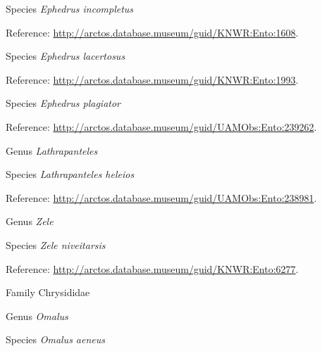 \documentclass[9pt, article]{memoir}
\begin{document}
\begin{multicols}{2}
\vspace{6pt}\noindent\hspace{36pt}Species \textit{Ephedrus incompletus}


\vspace{6pt}Reference: 
\url{http://arctos.database.museum/guid/KNWR:Ento:1608}.

\vspace{6pt}\noindent\hspace{36pt}Species \textit{Ephedrus lacertosus}


\vspace{6pt}Reference: 
\url{http://arctos.database.museum/guid/KNWR:Ento:1993}.

\vspace{6pt}\noindent\hspace{36pt}Species \textit{Ephedrus plagiator}


\vspace{6pt}Reference: 
\url{http://arctos.database.museum/guid/UAMObs:Ento:239262}.

\vspace{6pt}\noindent\hspace{30pt}Genus \textit{Lathrapanteles}


\vspace{6pt}\noindent\hspace{36pt}Species \textit{Lathrapanteles heleios}


\vspace{6pt}Reference: 
\url{http://arctos.database.museum/guid/UAMObs:Ento:238981}.

\vspace{6pt}\noindent\hspace{30pt}Genus \textit{Zele}


\vspace{6pt}\noindent\hspace{36pt}Species \textit{Zele niveitarsis}


\vspace{6pt}Reference: 
\url{http://arctos.database.museum/guid/KNWR:Ento:6277}.

\vspace{6pt}\noindent\hspace{24pt}Family Chrysididae


\vspace{6pt}\noindent\hspace{30pt}Genus \textit{Omalus}


\vspace{6pt}\noindent\hspace{36pt}Species \textit{Omalus aeneus}



\end{multicols}
\end{document}
